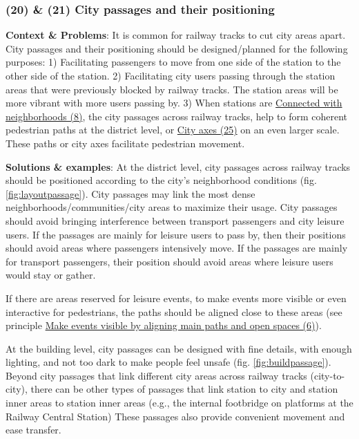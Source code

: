 \documentclass{article}
\begin{document}
\subsubsection{(20) \& (21) City passages and their positioning}
\label{(20 21) City passages and their positioning}

\textbf{Context \& Problems}: It is common for railway tracks to cut city areas apart. City passages and their positioning should be designed/planned for the following purposes:
1) Facilitating passengers to move from one side of the station to the other side of the station.
2) Facilitating city users passing through the station areas that were previously blocked by railway tracks. The station areas will be more vibrant with more users passing by.
3) When stations are \hyperref[Connect with neighborhoods]{Connected with neighborhoods (8)}, the city passages across railway tracks, help to form coherent pedestrian paths at the district level, or \hyperref[(25) City axes]{City axes (25)} on an even larger scale. These paths or city axes facilitate pedestrian movement.

\textbf{Solutions \& examples}: At the district level, city passages across railway tracks should be positioned according to the city's neighborhood conditions (fig. \ref{fig:layoutpassage}). City passages may link the most dense neighborhoods/communities/city areas to maximize their usage. City passages should avoid bringing interference between transport passengers and city leisure users. If the passages are mainly for leisure users to pass by, then their positions should avoid areas where passengers intensively move. If the passages are mainly for transport passengers, their position should avoid areas where leisure users would stay or gather.


If there are areas reserved for leisure events, to make events more visible or even interactive for pedestrians, the paths should be aligned close to these areas (see principle \hyperref[(6) Make events visible by aligning main paths and open spaces]{Make events visible by aligning main paths and open spaces (6)}).

At the building level, city passages can be designed with fine details, with enough lighting, and not too dark to make people feel unsafe (fig. \ref{fig:buildpassage}). Beyond city passages that link different city areas across railway tracks (city-to-city), there can be other types of passages that link station to city and station inner areas to station inner areas (e.g., the internal footbridge on platforms at the Railway Central Station) These passages also provide convenient movement and ease transfer.
\end{document}

